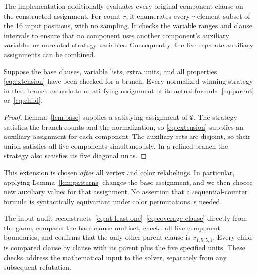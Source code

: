The implementation additionally evaluates every original component clause
on the constructed assignment. For count $r$, it enumerates every
$r$-element subset of the 16 input positions, with no sampling. It checks
the variable ranges and clause intervals to ensure that no component uses
another component's auxiliary variables or unrelated strategy variables.
Consequently, the five separate auxiliary assignments can be combined.

\begin{proposition}\label{prop:input}
Suppose the base clauses, variable lists, extra units, and all properties
\eqref{eq:extension} have been checked for a branch. Every normalized
winning strategy in that branch extends to a satisfying assignment of
its actual formula~\eqref{eq:parent} or~\eqref{eq:child}.
\end{proposition}
\begin{proof}
Lemma~\ref{lem:base} supplies a satisfying assignment of $\Phi$.
The strategy satisfies the branch counts and the normalization, so
\eqref{eq:extension} supplies an auxiliary assignment for each component.
The auxiliary sets are disjoint, so their union satisfies all five
components simultaneously. In a refined branch the strategy also
satisfies its five diagonal units.
\end{proof}

This extension is chosen \emph{after} all vertex and color relabelings.
In particular, applying Lemma~\ref{lem:patterns} changes the base
assignment, and we then choose new auxiliary values for that assignment.
No assertion that a sequential-counter formula is syntactically
equivariant under color permutations is needed.

The input audit reconstructs~\eqref{eq:at-least-one}--\eqref{eq:coverage-clause}
directly from the game, compares the base clause multiset, checks all five
component boundaries, and confirms that the only other parent clause is
$x_{1,5,5,1}$. Every child is compared clause by clause with its parent
plus the five specified units. These checks address the mathematical input
to the solver, separately from any subsequent refutation.

